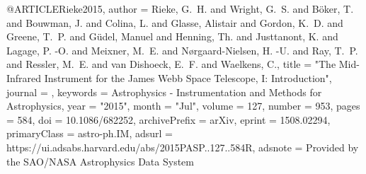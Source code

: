 \documentclass{aa}
\begin{document}
{{{{{{{{{{{{{{@ARTICLE{Rieke2015,
       author = {{Rieke}, G.~H. and {Wright}, G.~S. and {B{\"o}ker}, T. and
         {Bouwman}, J. and {Colina}, L. and {Glasse}, Alistair and
         {Gordon}, K.~D. and {Greene}, T.~P. and {G{\"u}del}, Manuel and
         {Henning}, Th. and {Justtanont}, K. and {Lagage}, P. -O. and
         {Meixner}, M.~E. and {N{\o}rgaard-Nielsen}, H. -U. and {Ray}, T.~P. and
         {Ressler}, M.~E. and {van Dishoeck}, E.~F. and {Waelkens}, C.},
        title = "{The Mid-Infrared Instrument for the James Webb Space Telescope, I: Introduction}",
      journal = {\pasp},
     keywords = {Astrophysics - Instrumentation and Methods for Astrophysics},
         year = "2015",
        month = "Jul",
       volume = {127},
       number = {953},
        pages = {584},
          doi = {10.1086/682252},
archivePrefix = {arXiv},
       eprint = {1508.02294},
 primaryClass = {astro-ph.IM},
       adsurl = {https://ui.adsabs.harvard.edu/abs/2015PASP..127..584R},
      adsnote = {Provided by the SAO/NASA Astrophysics Data System}
}

}}}}}}}}}}}}}}
\end{document}
